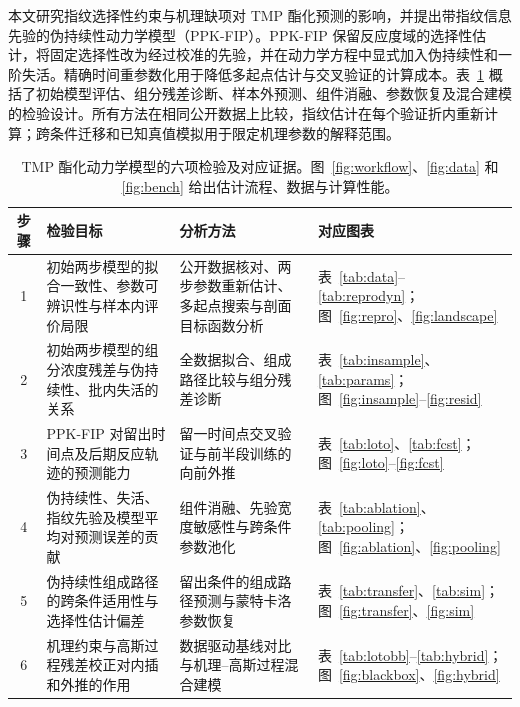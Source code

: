 本文研究指纹选择性约束与机理缺项对 TMP 酯化预测的影响，并提出带指纹信息先验的伪持续性动力学模型（PPK-FIP）。PPK-FIP 保留反应度域的选择性估计，将固定选择性改为经过校准的先验，并在动力学方程中显式加入伪持续性和一阶失活。精确时间重参数化用于降低多起点估计与交叉验证的计算成本。表~\ref{tab:roadmap} 概括了初始模型评估、组分残差诊断、样本外预测、组件消融、参数恢复及混合建模的检验设计。所有方法在相同公开数据上比较，指纹估计在每个验证折内重新计算；跨条件迁移和已知真值模拟用于限定机理参数的解释范围。

\begin{table}[!htbp]
\centering\small
\caption{TMP 酯化动力学模型的六项检验及对应证据。图~\ref{fig:workflow}、\ref{fig:data} 和 \ref{fig:bench} 给出估计流程、数据与计算性能。}\label{tab:roadmap}
\begin{tabular}{@{}c p{5.1cm} p{4.4cm} p{4.4cm}@{}}
\toprule
步骤 & 检验目标 & 分析方法 & 对应图表 \\
\midrule
1 & 初始两步模型的拟合一致性、参数可辨识性与样本内评价局限 & 公开数据核对、两步参数重新估计、多起点搜索与剖面目标函数分析 & 表~\ref{tab:data}--\ref{tab:reprodyn}；图~\ref{fig:repro}、\ref{fig:landscape} \\
2 & 初始两步模型的组分浓度残差与伪持续性、批内失活的关系 & 全数据拟合、组成路径比较与组分残差诊断 & 表~\ref{tab:insample}、\ref{tab:params}；图~\ref{fig:insample}--\ref{fig:resid} \\
3 & PPK-FIP 对留出时间点及后期反应轨迹的预测能力 & 留一时间点交叉验证与前半段训练的向前外推 & 表~\ref{tab:loto}、\ref{tab:fcst}；图~\ref{fig:loto}--\ref{fig:fcst} \\
4 & 伪持续性、失活、指纹先验及模型平均对预测误差的贡献 & 组件消融、先验宽度敏感性与跨条件参数池化 & 表~\ref{tab:ablation}、\ref{tab:pooling}；图~\ref{fig:ablation}、\ref{fig:pooling} \\
5 & 伪持续性组成路径的跨条件适用性与选择性估计偏差 & 留出条件的组成路径预测与蒙特卡洛参数恢复 & 表~\ref{tab:transfer}、\ref{tab:sim}；图~\ref{fig:transfer}、\ref{fig:sim} \\
6 & 机理约束与高斯过程残差校正对内插和外推的作用 & 数据驱动基线对比与机理--高斯过程混合建模 & 表~\ref{tab:lotobb}--\ref{tab:hybrid}；图~\ref{fig:blackbox}、\ref{fig:hybrid} \\
\bottomrule
\end{tabular}
\end{table}
